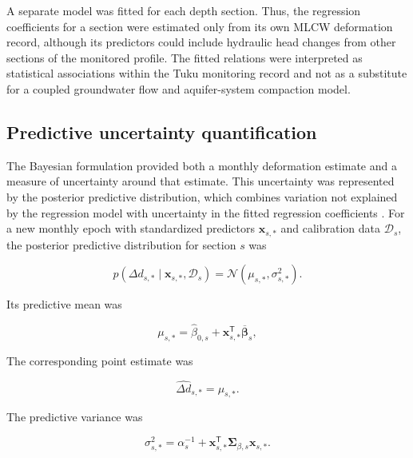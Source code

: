 A separate model was fitted for each depth section. Thus, the regression coefficients for a section were estimated only from its own MLCW deformation record, although its predictors could include hydraulic head changes from other sections of the monitored profile. The fitted relations were interpreted as statistical associations within the Tuku monitoring record and not as a substitute for a coupled groundwater flow and aquifer-system compaction model.

\subsection{Predictive uncertainty quantification}
\label{subsec:predictive_uncertainty}

The Bayesian formulation provided both a monthly deformation estimate and a measure of uncertainty around that estimate. This uncertainty was represented by the posterior predictive distribution, which combines variation not explained by the regression model with uncertainty in the fitted regression coefficients \citep{mackay_bayesian_1992}. For a new monthly epoch with standardized predictors $\boldsymbol{x}_{s,*}$ and calibration data $\mathcal{D}_s$, the posterior predictive distribution for section $s$ was

\begin{equation}
p
\left(
\Delta d_{s,*}
\mid
\boldsymbol{x}_{s,*},
\mathcal{D}_s
\right)
=
\mathcal{N}
\left(
\mu_{s,*},
\sigma_{s,*}^{2}
\right).
\label{eq:posterior_predictive}
\end{equation}

Its predictive mean was

\begin{equation}
\mu_{s,*}
=
\widehat{\beta}_{0,s}
+
\boldsymbol{x}_{s,*}^{\mathsf{T}}
\overline{\boldsymbol{\beta}}_s,
\label{eq:predictive_mean}
\end{equation}

The corresponding point estimate was

\begin{equation}
\widehat{\Delta d}_{s,*}
=
\mu_{s,*}.
\label{eq:monthly_deformation_estimate}
\end{equation}

The predictive variance was

\begin{equation}
\sigma_{s,*}^{2}
=
\alpha_s^{-1}
+
\boldsymbol{x}_{s,*}^{\mathsf{T}}
\boldsymbol{\Sigma}_{\beta,s}
\boldsymbol{x}_{s,*}.
\label{eq:predictive_variance}
\end{equation}

